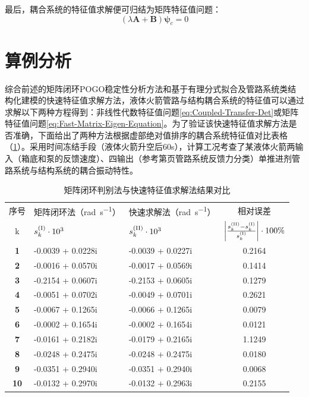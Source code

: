 最后，耦合系统的特征值求解便可归结为矩阵特征值问题：
\begin{equation}
	\label{eq:Fast-Matrix-Eigen-Equation}
	\left( \lambda \boldsymbol{A}+ \boldsymbol{B} \right)\boldsymbol{\psi}_c=0
\end{equation}

\section{算例分析}
\label{sec:Lumped-Numerical-Simulation}
综合前述的矩阵闭环POGO稳定性分析方法和基于有理分式拟合及管路系统类结构化建模的快速特征值求解方法，液体火箭管路与结构耦合系统的特征值可以通过求解以下两种方程得到：非线性代数特征值问题\eqref{eq:Coupled-Transfer-Det}或矩阵特征值问题\eqref{eq:Fast-Matrix-Eigen-Equation}。为了验证该快速特征值求解方法是否准确，下面给出了两种方法根据虚部绝对值排序的耦合系统特征值对比表格（\ref{table:Direct-Fast-Comparison}）。采用时间冻结手段（液体火箭升空后60s），计算工况考查了某液体火箭两输入（箱底和泵的反馈速度）、四输出（参考第\pageref{Page:Typical-Feedback-Force}页管路系统反馈力分类）单推进剂管路系统与结构系统的耦合振动特性。

\begin{table}[htp]
	\renewcommand{\arraystretch}{1.5}
	\centering
	\caption{矩阵闭环判别法与快速特征值求解法结果对比}
	\label{table:Direct-Fast-Comparison}
	\begin{tabularx}{\textwidth}{c>{\centering}X>{\centering}Xc}
	\toprule
		序号 & 矩阵闭环法（\si{\radian\per\s}） & 快速求解法（\si{\radian\per\s}） & 相对误差 \\ 
		k & $ s_k^{(\mathrm{\RNum{1}})}\cdot10^{3}$ & $s_k^{(\mathrm{\RNum{2}})}\cdot10^{3}$ & $\left| \frac{s_k^{(\mathrm{\RNum{2}})}-s_k^{(\mathrm{\RNum{1}})}}{s_k^{(\mathrm{\RNum{1}})}} \right| \cdot 100 \si{\percent}$  \\ \midrule
		\textbf{1 } & \num{-0.0039 + 0.0228i} & \num{-0.0039 + 0.0227i} & \num{0.2164} \\
		\textbf{2 } & \num{-0.0016 + 0.0570i} & \num{-0.0017 + 0.0569i} & \num{0.1414} \\
		\textbf{3 } & \num{-0.2154 + 0.0607i} & \num{-0.2153 + 0.0605i} & \num{0.1279} \\
		\textbf{4 } & \num{-0.0051 + 0.0702i} & \num{-0.0049 + 0.0701i} & \num{0.2621} \\
		\textbf{5 } & \num{-0.0067 + 0.1265i} & \num{-0.0066 + 0.1265i} & \num{0.0079} \\
		\textbf{6 } & \num{-0.0002 + 0.1654i} & \num{-0.0002 + 0.1654i} & \num{0.0121} \\
		\textbf{7 } & \num{-0.0161 + 0.2182i} & \num{-0.0179 + 0.2165i} & \num{1.1249} \\
		\textbf{8 } & \num{-0.0248 + 0.2475i} & \num{-0.0248 + 0.2475i} & \num{0.0180} \\
		\textbf{9 } & \num{-0.0351 + 0.2940i} & \num{-0.0351 + 0.2940i} & \num{0.0068} \\
		\textbf{10} & \num{-0.0132 + 0.2970i} & \num{-0.0132 + 0.2963i} & \num{0.2155} \\ \bottomrule
	\end{tabularx}
\end{table}

